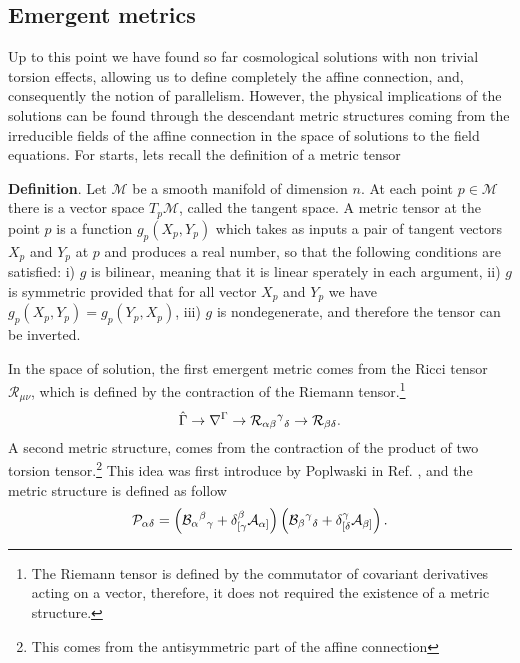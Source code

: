 \subsection{Emergent metrics}

Up to this point we have found so far cosmological solutions with non trivial torsion
effects, allowing us to define completely the affine connection, and, consequently
the notion of parallelism. However, the physical implications of the solutions can be
found through the descendant metric structures coming from the irreducible fields 
of the affine connection in the space of solutions to the field equations. 
For starts, lets recall the definition of a metric tensor

\textbf{Definition}. Let $\mathcal{M}$ be a smooth manifold of dimension $n$. At each
point $p \in \mathcal{M}$ there is a vector space $T_p\mathcal{M}$, called the tangent
space. A metric tensor at the point $p$ is a function $g_p (X_p, Y_p)$ which takes as 
inputs a pair of tangent vectors $X_p$ and $Y_p$ at $p$ and produces a real number, 
so that the following conditions are satisfied: i) $g$ is bilinear, meaning that it is
linear sperately in each argument, ii) $g$ is symmetric provided that for all vector $X_p$ and
$Y_p$ we have $g_p(X_p, Y_p) = g_p (Y_p, X_p)$, iii) $g$ is nondegenerate, and therefore the
tensor can be inverted.

In the space of solution, the first emergent metric comes from the Ricci tensor $\mathcal{R}_{\mu\nu}$, which is 
defined by the contraction of the Riemann tensor.\footnote{The Riemann tensor is defined 
by the commutator of covariant derivatives acting on a vector, therefore, it does not 
required the existence of a metric structure.} 
\begin{equation}
    \label{chain}
    \hat{\Gamma} \to \nabla^{\Gamma} \to \mathcal{R}_{\alpha\beta}{}^{ \gamma}{}_{\delta} \to \mathcal{R}_{\beta\delta}.
\end{equation}
A second metric structure, comes from the contraction of the product of two torsion 
tensor.\footnote{This comes from the antisymmetric part of the affine connection} 
This idea was first introduce by Poplwaski in Ref. \cite{Pop_awski_2013}, and the metric 
structure is defined as follow
\begin{equation}
    \mathcal{P}_{\alpha\delta} = \left(\mathcal{B}_{\alpha}{}^{ \beta}{}_{\gamma} + \delta^{\beta}_{[\gamma}\mathcal{A}_{\alpha]}\right)\left(\mathcal{B}_{\beta}{}^{ \gamma}{}_{\delta} + \delta^{\gamma}_{[\delta}\mathcal{A}_{\beta]}\right).
\end{equation}

